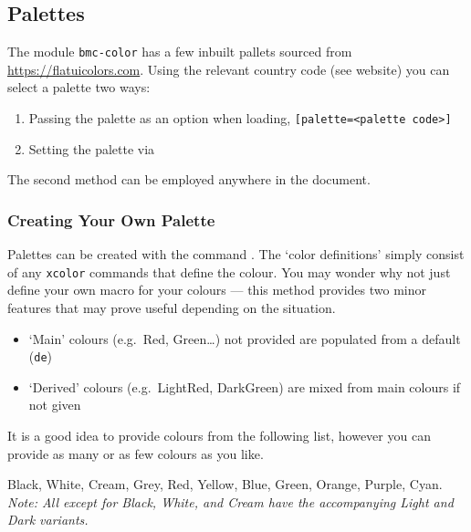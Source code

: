 \documentclass[solid,math,chem,code,plot]{bmc}
\begin{document}
\subsection{Palettes}
\label{subsec:palettes}
The module \texttt{bmc-color} has a few inbuilt pallets
sourced from \url{https://flatuicolors.com}.
Using the relevant country code (see website) you can select a palette two ways:
\begin{enumerate}
    \item Passing the palette as an option when loading, \texttt{[palette=<palette code>]}
    \item Setting the palette via \texttt{}
\end{enumerate}
The second method can be employed anywhere in the document.

\subsubsection{Creating Your Own Palette}

Palettes can be created with the command \texttt{}.
The `color definitions' simply consist of any \texttt{xcolor} commands that define the colour.
You may wonder why not just define your own macro for your colours ---
this method provides two minor features that may prove useful depending on the situation.
\begin{itemize}
    \item `Main' colours (e.g.\ Red, Green\dots) not provided are populated from a default (\texttt{de})
    \item `Derived' colours (e.g.\ LightRed, DarkGreen) are mixed from main colours if not given
\end{itemize}
It is a good idea to provide colours from the following list, however you can provide as many or as few
colours as you like.

\begin{center}
    \selectfont
    \textcolor{Black!50!text}{Black},
    \textcolor{White!50!text}{White},
    \textcolor{Cream!50!text}{Cream},
    \textcolor{Grey!50!text}{Grey},
    \textcolor{Red!50!text}{Red},
    \textcolor{Yellow!50!text}{Yellow},
    \textcolor{Blue!50!text}{Blue},
    \textcolor{Green!50!text}{Green},
    \textcolor{Orange!50!text}{Orange},
    \textcolor{Purple!50!text}{Purple},
    \textcolor{Cyan!50!text}{Cyan}.
    \\[0.5ex]
    \selectfont
    \upshape\scriptsize\slshape
    Note: All except for Black, White, and Cream have the
    accompanying Light and Dark variants.
\end{center}
\end{document}
